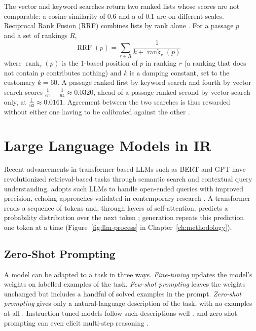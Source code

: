 The vector and keyword searches return two ranked lists whose scores are not comparable: a cosine similarity of 0.6 and a  of 0.1 are on different scales. Reciprocal Rank Fusion (RRF) combines lists by rank alone \citep{cormack2009rrf}. For a passage $p$ and a set of rankings $R$,
\begin{equation}
  \operatorname{RRF}(p) = \sum_{r \in R} \frac{1}{k + \operatorname{rank}_r(p)} \label{eq:rrf}
\end{equation}
where $\operatorname{rank}_r(p)$ is the 1-based position of $p$ in ranking $r$ (a ranking that does not contain $p$ contributes nothing) and $k$ is a damping constant, set to the customary $k = 60$. A passage ranked first by keyword search and fourth by vector search scores $\tfrac{1}{61} + \tfrac{1}{64} \approx 0.0320$, ahead of a passage ranked second by vector search only, at $\tfrac{1}{62} \approx 0.0161$. Agreement between the two searches is thus rewarded without either one having to be calibrated against the other \citep{bruch2022}.

\section{Large Language Models in IR}\label{sec:llm-ir}

Recent advancements in transformer-based LLMs such as BERT \citep{devlin2019} and GPT \citep{radford2019,brown2020} have revolutionized retrieval-based tasks through semantic search and contextual query understanding. \cs{} adopts such LLMs to handle open-ended queries with improved precision, echoing approaches validated in contemporary research \citep{gao2021coil,zhu2023survey}. A transformer reads a sequence of tokens and, through layers of self-attention, predicts a probability distribution over the next token \citep{vaswani2017}; generation repeats this prediction one token at a time (Figure~\ref{fig:llm-process} in Chapter~\ref{ch:methodology}).

\subsection{Zero-Shot Prompting}\label{sec:zero-shot}

A model can be adapted to a task in three ways. \emph{Fine-tuning} updates the model's weights on labelled examples of the task. \emph{Few-shot prompting} leaves the weights unchanged but includes a handful of solved examples in the prompt. \emph{Zero-shot prompting} gives only a natural-language description of the task, with no examples at all \citep{brown2020}. Instruction-tuned models follow such descriptions well \citep{wei2022flan}, and zero-shot prompting can even elicit multi-step reasoning \citep{kojima2022}.


